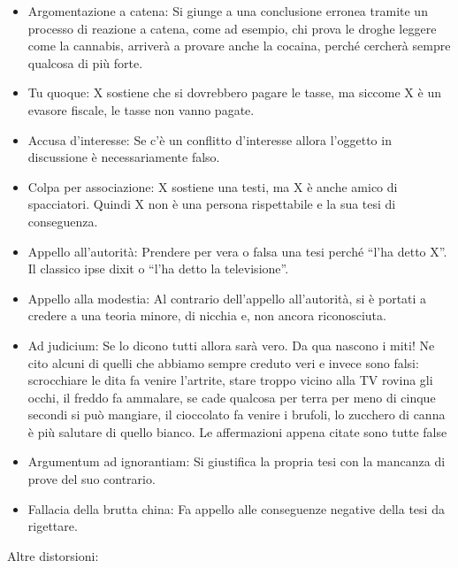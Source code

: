 \documentclass[12pt]{book} %
\begin{document}
\begin{itemize}
\item Argomentazione a catena: Si giunge a una conclusione erronea tramite un processo di reazione a catena, come ad
esempio, chi prova le droghe leggere come la cannabis, arriverà a provare anche la cocaina, perché cercherà sempre
qualcosa di più forte.
\item Tu quoque: X sostiene che si dovrebbero pagare le tasse, ma siccome X è un evasore fiscale, le tasse non vanno
pagate.
\item Accusa d'interesse: Se c'è un conflitto d'interesse allora
l'oggetto in discussione è necessariamente falso.
\item Colpa per associazione: X sostiene una testi, ma X è anche amico di spacciatori. Quindi X non è una persona
rispettabile e la sua tesi di conseguenza.
\item Appello all'autorità: Prendere per vera o falsa una tesi perché “l'ha detto X”. Il classico
ipse dixit o “l'ha detto la televisione”.
\item Appello alla modestia: Al contrario dell'appello all'autorità, si è portati a credere a una teoria minore, di
nicchia e, non ancora riconosciuta.
\item Ad judicium: Se lo dicono tutti allora sarà vero. Da qua nascono i miti! Ne cito alcuni di quelli che abbiamo
sempre creduto veri e invece sono falsi: scrocchiare le dita fa venire l'artrite, stare troppo vicino alla TV rovina
gli occhi, il freddo fa ammalare, se cade qualcosa per terra per meno di cinque secondi si può mangiare, il cioccolato
fa venire i brufoli, lo zucchero di canna è più salutare di quello bianco. Le affermazioni appena citate sono tutte
false
\item Argumentum ad ignorantiam: Si giustifica la propria tesi con la mancanza di prove del suo contrario.
\item Fallacia della brutta china: Fa appello alle conseguenze negative della tesi da rigettare.
\end{itemize}

Altre distorsioni:
\end{document}
